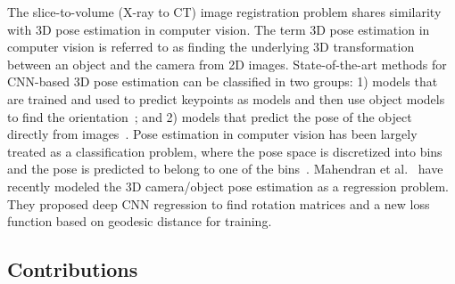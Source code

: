 \documentclass[journal,transmag]{IEEEtran}
\begin{document}
The slice-to-volume (X-ray to CT) image registration problem shares similarity with 3D pose estimation in computer vision. The term 3D pose estimation in computer vision is referred to as finding the underlying 3D transformation between an object and the camera from 2D images. State-of-the-art methods for CNN-based 3D pose estimation can be classified in two groups: 1) models that are trained and used to predict keypoints as models and then use object models to find the orientation~\cite{wu2016single, pavlakos20176}; and 2) models that predict the pose of the object directly from images~\cite{tulsiani2015viewpoints, su2015render}. Pose estimation in computer vision has been largely treated as a classification problem, where the pose space is discretized into bins and the pose is predicted to belong to one of the bins~\cite{tulsiani2015viewpoints,su2015render}. Mahendran et al.~\cite{mahendran20173d} have recently modeled the 3D camera/object pose estimation as a regression problem. %
They proposed deep CNN regression to find rotation matrices and a new loss function based on geodesic distance for training.


\subsection{Contributions}
\end{document}
